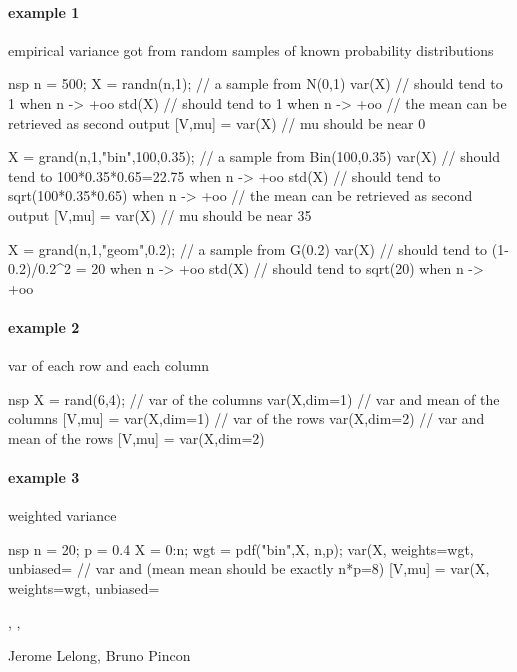 \begin{examples}
\paragraph{example 1} empirical variance got from random samples of known probability distributions 
\begin{mintednsp}{nsp}
n = 500;
X = randn(n,1);  // a sample from N(0,1)
var(X)   // should tend to 1 when n -> +oo
std(X)   // should tend to 1 when n -> +oo
// the mean can be retrieved as second output
[V,mu] = var(X)  // mu should be near 0

X = grand(n,1,"bin",100,0.35); // a sample from Bin(100,0.35)
var(X)   // should tend to 100*0.35*0.65=22.75  when n -> +oo
std(X)   // should tend to sqrt(100*0.35*0.65)  when n -> +oo
// the mean can be retrieved as second output
[V,mu] = var(X)  // mu should be near 35

X = grand(n,1,"geom",0.2); // a sample from G(0.2)
var(X)   // should tend to (1-0.2)/0.2^2 = 20 when n -> +oo
std(X)   // should tend to sqrt(20) when n -> +oo
\end{mintednsp}

\paragraph{example 2} var of each row and each column
\begin{mintednsp}{nsp}
X = rand(6,4);
// var of the columns
var(X,dim=1)
// var and mean of the columns
[V,mu] = var(X,dim=1)
// var of the rows
var(X,dim=2)
// var and mean of the rows
[V,mu] = var(X,dim=2)
\end{mintednsp}

\paragraph{example 3} weighted variance
\begin{mintednsp}{nsp}
n = 20; p = 0.4
X = 0:n;
wgt = pdf("bin",X, n,p);
var(X, weights=wgt, unbiased=%
// var and (mean mean should be exactly n*p=8)
[V,mu] = var(X, weights=wgt, unbiased=%
\end{mintednsp}


\end{examples}

\begin{manseealso}
  , , 
\end{manseealso}

\begin{authors}
  Jerome Lelong, Bruno Pincon
\end{authors}
